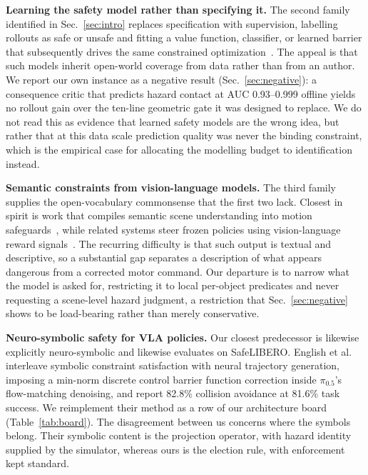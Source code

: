 \documentclass[conference]{IEEEtran}
\newcommand{\pifive}{$\pi_{0.5}$}
\begin{document}
\textbf{Learning the safety model rather than specifying it.} The second family identified in Sec.~\ref{sec:intro} replaces specification with supervision, labelling rollouts as safe or unsafe and fitting a value function, classifier, or learned barrier that subsequently drives the same constrained optimization~\cite{nakamura2025latentcbf,safediffuser}. The appeal is that such models inherit open-world coverage from data rather than from an author. We report our own instance as a negative result (Sec.~\ref{sec:negative}): a consequence critic that predicts hazard contact at AUC 0.93--0.999 offline yields no rollout gain over the ten-line geometric gate it was designed to replace. We do not read this as evidence that learned safety models are the wrong idea, but rather that at this data scale prediction quality was never the binding constraint, which is the empirical case for allocating the modelling budget to identification instead.

\textbf{Semantic constraints from vision-language models.} The third family supplies the open-vocabulary commonsense that the first two lack. Closest in spirit is work that compiles semantic scene understanding into motion safeguards~\cite{brunke2025semantic}, while related systems steer frozen policies using vision-language reward signals~\cite{vls}. The recurring difficulty is that such output is textual and descriptive, so a substantial gap separates a description of what appears dangerous from a corrected motor command. Our departure is to narrow what the model is asked for, restricting it to local per-object predicates and never requesting a scene-level hazard judgment, a restriction that Sec.~\ref{sec:negative} shows to be load-bearing rather than merely conservative.

\textbf{Neuro-symbolic safety for VLA policies.} Our closest predecessor is likewise explicitly neuro-symbolic and likewise evaluates on SafeLIBERO. English et al.~\cite{sota2607} interleave symbolic constraint satisfaction with neural trajectory generation, imposing a min-norm discrete control barrier function correction inside \pifive{}'s flow-matching denoising, and report 82.8\% collision avoidance at 81.6\% task success. We reimplement their method as a row of our architecture board (Table~\ref{tab:board}). The disagreement between us concerns where the symbols belong. Their symbolic content is the projection operator, with hazard identity supplied by the simulator, whereas ours is the election rule, with enforcement kept standard.
\end{document}
